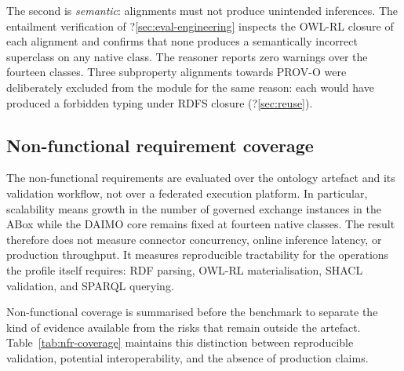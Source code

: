 \documentclass[Afour,sagev,times]{sagej}
\begin{document}
The second is \emph{semantic}: alignments must not produce unintended inferences. The entailment verification of ?\ref{sec:eval-engineering} inspects the OWL-RL closure of each alignment and confirms that none produces a semantically incorrect superclass on any native class. The reasoner reports zero warnings over the fourteen classes. Three subproperty alignments towards PROV-O were deliberately excluded from the module for the same reason: each would have produced a forbidden typing under RDFS closure (?\ref{sec:reuse}).

\subsection{Non-functional requirement coverage}\label{sec:eval-nfr}

The non-functional requirements are evaluated over the ontology artefact and its validation workflow, not over a federated execution platform. In particular, scalability means growth in the number of governed exchange instances in the ABox while the DAIMO core remains fixed at fourteen native classes. The result therefore does not measure connector concurrency, online inference latency, or production throughput. It measures reproducible tractability for the operations the profile itself requires: RDF parsing, OWL-RL materialisation, SHACL validation, and SPARQL querying.

Non-functional coverage is summarised before the benchmark to separate the kind of evidence available from the risks that remain outside the artefact. Table~\ref{tab:nfr-coverage} maintains this distinction between reproducible validation, potential interoperability, and the absence of production claims.
\end{document}

